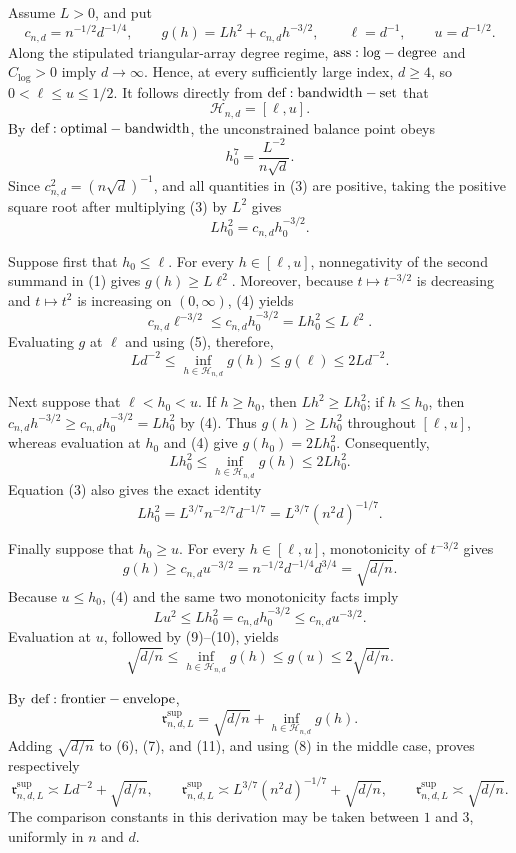 Assume \(L>0\), and put
\[
 c_{n,d}=n^{-1/2}d^{-1/4},\qquad
 g(h)=Lh^2+c_{n,d}h^{-3/2},\qquad
 \ell=d^{-1},\qquad u=d^{-1/2}.
\tag{1}
\]
Along the stipulated triangular-array degree regime, \({\rm ass:log-degree}\) and \(C_{\log}>0\) imply \(d\to\infty\).  Hence, at every sufficiently large index, \(d\ge4\), so \(0<\ell\le u\le1/2\).  It follows directly from \({\rm def:bandwidth-set}\) that
\[
 \mathcal H_{n,d}=[\ell,u].
\tag{2}
\]
By \({\rm def:optimal-bandwidth}\), the unconstrained balance point obeys
\[
 h_0^7=\frac{L^{-2}}{n\sqrt d}.
\tag{3}
\]
Since \(c_{n,d}^2=(n\sqrt d)^{-1}\), and all quantities in (3) are positive, taking the positive square root after multiplying (3) by \(L^2\) gives
\[
 Lh_0^2=c_{n,d}h_0^{-3/2}.
\tag{4}
\]

Suppose first that \(h_0\le\ell\).  For every \(h\in[\ell,u]\), nonnegativity of the second summand in (1) gives \(g(h)\ge L\ell^2\).  Moreover, because \(t\mapsto t^{-3/2}\) is decreasing and \(t\mapsto t^2\) is increasing on \((0,\infty)\), (4) yields
\[
 c_{n,d}\ell^{-3/2}
 \le c_{n,d}h_0^{-3/2}
 =Lh_0^2
 \le L\ell^2.
\tag{5}
\]
Evaluating \(g\) at \(\ell\) and using (5), therefore,
\[
 Ld^{-2}
 \le \inf_{h\in\mathcal H_{n,d}}g(h)
 \le g(\ell)
 \le 2Ld^{-2}.
\tag{6}
\]

Next suppose that \(\ell<h_0<u\).  If \(h\ge h_0\), then \(Lh^2\ge Lh_0^2\); if \(h\le h_0\), then \(c_{n,d}h^{-3/2}\ge c_{n,d}h_0^{-3/2}=Lh_0^2\) by (4).  Thus \(g(h)\ge Lh_0^2\) throughout \([\ell,u]\), whereas evaluation at \(h_0\) and (4) give \(g(h_0)=2Lh_0^2\).  Consequently,
\[
 Lh_0^2
 \le \inf_{h\in\mathcal H_{n,d}}g(h)
 \le 2Lh_0^2.
\tag{7}
\]
Equation (3) also gives the exact identity
\[
 Lh_0^2=L^{3/7}n^{-2/7}d^{-1/7}
 =L^{3/7}(n^2d)^{-1/7}.
\tag{8}
\]

Finally suppose that \(h_0\ge u\).  For every \(h\in[\ell,u]\), monotonicity of \(t^{-3/2}\) gives
\[
 g(h)\ge c_{n,d}u^{-3/2}
 =n^{-1/2}d^{-1/4}d^{3/4}
 =\sqrt{d/n}.
\tag{9}
\]
Because \(u\le h_0\), (4) and the same two monotonicity facts imply
\[
 Lu^2\le Lh_0^2=c_{n,d}h_0^{-3/2}\leq c_{n,d}u^{-3/2}.
\tag{10}
\]
Evaluation at \(u\), followed by (9)--(10), yields
\[
 \sqrt{d/n}
 \le \inf_{h\in\mathcal H_{n,d}}g(h)
 \le g(u)
 \le 2\sqrt{d/n}.
\tag{11}
\]

By \({\rm def:frontier-envelope}\),
\[
 \mathfrak r^{\mathrm{sup}}_{n,d,L}
 =\sqrt{d/n}+\inf_{h\in\mathcal H_{n,d}}g(h).
\tag{12}
\]
Adding \(\sqrt{d/n}\) to (6), (7), and (11), and using (8) in the middle case, proves respectively
\[
 \mathfrak r^{\mathrm{sup}}_{n,d,L}
 \asymp Ld^{-2}+\sqrt{d/n},
 \qquad
 \mathfrak r^{\mathrm{sup}}_{n,d,L}
 \asymp L^{3/7}(n^2d)^{-1/7}+\sqrt{d/n},
 \qquad
 \mathfrak r^{\mathrm{sup}}_{n,d,L}
 \asymp\sqrt{d/n}.
\tag{13}
\]
The comparison constants in this derivation may be taken between \(1\) and \(3\), uniformly in \(n\) and \(d\).


